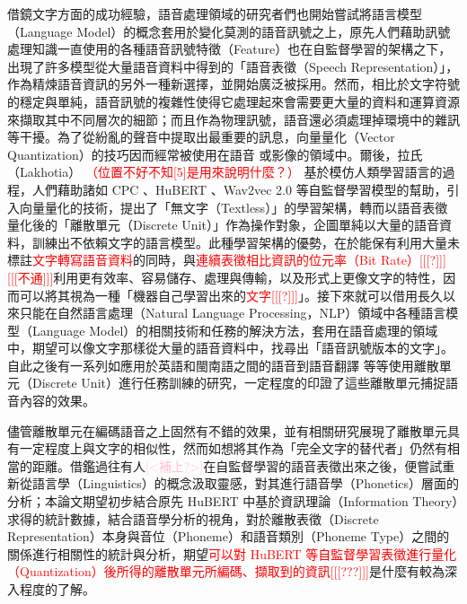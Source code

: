         借鏡文字方面的成功經驗，語音處理領域的研究者們也開始嘗試將語言模型（Language Model）的概念套用於變化莫測的語音訊號之上，原先人們藉助訊號處理知識一直使用的各種語音訊號特徵（Feature）也在自監督學習的架構之下，出現了許多模型從大量語音資料中得到的「語音表徵（Speech Representation）」，作為精煉語音資訊的另外一種新選擇，並開始廣泛被採用。然而，相比於文字符號的穩定與單純，語音訊號的複雜性使得它處理起來會需要更大量的資料和運算資源來擷取其中不同層次的細節；而且作為物理訊號，語音還必須處理掉環境中的雜訊等干擾。為了從紛亂的聲音中提取出最重要的訊息，向量量化（Vector Quantization）的技巧因而經常被使用在語音 \cite{chorowski_unsupervised_2019,chen_vector_2023,zhao_speech_2023} 或影像的領域中。爾後，拉氏（Lakhotia） \cite{lakhotia_generative_2021-1} \textcolor{red}{（位置不好不知[5]是用來說明什麼？）} 基於模仿人類學習語言的過程，人們藉助諸如 CPC \cite{oord_representation_2019}、HuBERT \cite{hsu_hubert_2021}、Wav2vec 2.0 \cite{baevski_wav2vec_2020} 等自監督學習模型的幫助，引入向量量化的技術，提出了「無文字（Textless）」的學習架構，轉而以語音表徵量化後的「離散單元（Discrete Unit）」作為操作對象，企圖單純以大量的語音資料，訓練出不依賴文字的語言模型。此種學習架構的優勢，在於能保有利用大量未標註\textcolor{red}{文字轉寫語音資料}的同時，與\textcolor{red}{連續表徵相比資訊的位元率（Bit Rate）[[[?]]][[[不通]]]}利用更有效率、容易儲存、處理與傳輸，以及形式上更像文字的特性，因而可以將其視為一種「機器自己學習出來的\textcolor{red}{文字[[[?]]]}」。接下來就可以借用長久以來只能在自然語言處理（Natural Language Processing，NLP）領域中各種語言模型（Language Model）的相關技術和任務的解決方法，套用在語音處理的領域中，期望可以像文字那樣從大量的語音資料中，找尋出「語音訊號版本的文字」。自此之後有一系列如應用於英語和閩南語之間的語音到語音翻譯 \cite{chen_speech--speech_2023} 等等使用離散單元（Discrete Unit）進行任務訓練的研究，一定程度的印證了這些離散單元捕捉語音內容的效果。

        儘管離散單元在編碼語音之上固然有不錯的效果，並有相關研究展現了離散單元具有一定程度上與文字的相似性，然而如想將其作為「完全文字的替代者」仍然有相當的距離。借鑑過往有人\textcolor{pink}{[<補上?>]}在自監督學習的語音表徵出來之後，便嘗試重新從語言學（Linguistics）的概念汲取靈感，對其進行語音學（Phonetics）層面的分析；本論文期望初步結合原先 HuBERT 中基於資訊理論（Information Theory）求得的統計數據，結合語音學分析的視角，對於離散表徵（Discrete Representation）本身與音位（Phoneme）和語音類別（Phoneme Type）之間的關係進行相關性的統計與分析，期望\textcolor{red}{可以對 HuBERT 等自監督學習表徵進行量化（Quantization）後所得的離散單元所編碼、擷取到的資訊[[[???]]]}是什麼有較為深入程度的了解。

